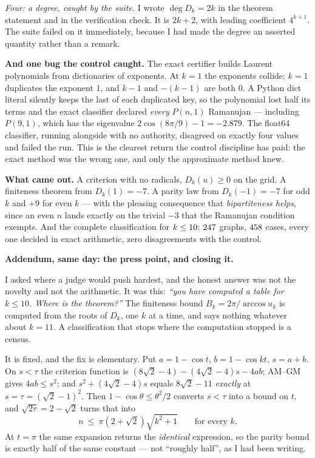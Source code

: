 \documentclass[12pt]{article}
\begin{document}
\emph{Four: a degree, caught by the suite.} I wrote $\deg D_k=2k$ in the
theorem statement and in the verification check. It is $2k+2$, with leading
coefficient $4^{k+1}$. The suite failed on it immediately, because I had made
the degree an asserted quantity rather than a remark.

\textbf{And one bug the control caught.} The exact certifier builds Laurent
polynomials from dictionaries of exponents. At $k=1$ the exponents collide:
$k=1$ duplicates the exponent $1$, and $k-1$ and $-(k-1)$ are both $0$. A
Python dict literal silently keeps the last of each duplicated key, so the
polynomial lost half its terms and the exact classifier declared \emph{every}
$P(n,1)$ Ramanujan --- including $P(9,1)$, which has the eigenvalue
$2\cos(8\pi/9)-1=-2.879$. The float64 classifier, running alongside with no
authority, disagreed on exactly four values and failed the run. This is the
clearest return the control discipline has paid: the exact method was the wrong
one, and only the approximate method knew.

\textbf{What came out.} A criterion with no radicals, $D_k(u)\ge0$ on the grid.
A finiteness theorem from $D_k(1)=-7$. A parity law from $D_k(-1)=-7$ for odd
$k$ and $+9$ for even $k$ --- with the pleasing consequence that
\emph{bipartiteness helps}, since an even $n$ lands exactly on the trivial
$-3$ that the Ramanujan condition exempts. And the complete classification for
$k\le10$: $247$ graphs, $458$ cases, every one decided in
exact arithmetic, zero disagreements with the control.

\textbf{Addendum, same day: the press point, and closing it.}

I asked where a judge would push hardest, and the honest answer was not the
novelty and not the arithmetic. It was this: \emph{``you have computed a table
for $k\le10$. Where is the theorem?''} The finiteness bound
$B_k=2\pi/\arccos u_k$ is computed from the roots of $D_k$, one $k$ at a time,
and says nothing whatever about $k=11$. A classification that stops where the
computation stopped is a census.

It is fixed, and the fix is elementary. Put $a=1-\cos t$, $b=1-\cos kt$,
$s=a+b$. On $s<\tau$ the criterion function is
$(8\sqrt2-4)-(4\sqrt2-4)s-4ab$; AM--GM gives $4ab\le s^2$; and
$s^2+(4\sqrt2-4)s$ equals $8\sqrt2-11$ \emph{exactly} at $s=\tau=(\sqrt2-1)^2$.
Then $1-\cos\theta\le\theta^2/2$ converts $s<\tau$ into a bound on $t$, and
$\sqrt{2\tau}=2-\sqrt2$ turns that into
\[
  n\ \le\ \pi(2+\sqrt2)\sqrt{k^2+1}\qquad\text{for every }k .
\]
At $t=\pi$ the same expansion returns the \emph{identical} expression, so the
parity bound is exactly half of the same constant --- not ``roughly half'', as I
had been writing.
\end{document}
